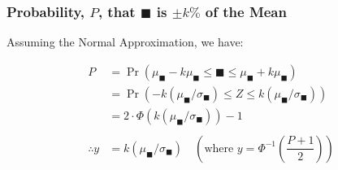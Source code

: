 \documentclass[
]{article}
\begin{document}
\begin{red}

\hypertarget{probability-p-that-blacksquare-is-pm-k-of-the-mean}{%
\subsubsection{\texorpdfstring{Probability, \(P\), that \(\blacksquare\)
is \(\pm k\%\) of the
Mean}{Probability, P, that \textbackslash blacksquare is \textbackslash pm k\textbackslash\% of the Mean}}\label{probability-p-that-blacksquare-is-pm-k-of-the-mean}}

Assuming the Normal Approximation, we have:

\[
  \begin{align}
  P &= \Pr(\mu_{\blacksquare} - k \mu_{\blacksquare} \le \blacksquare \le \mu_{\blacksquare} + k \mu_{\blacksquare}) \\
    &= \Pr(-k(\mu_{\blacksquare}/\sigma_{\blacksquare}) \le Z \le k(\mu_{\blacksquare}/\sigma_{\blacksquare})) \\
    &= 2 \cdot \Phi(k (\mu_\blacksquare/\sigma_\blacksquare)) - 1 \\ \\
  \therefore y &= k(\mu_\blacksquare/\sigma_\blacksquare) \quad \left(\text{where } y = \Phi^{-1}\left(\dfrac{P+1}{2}\right)\right)
  \end{align}
\]

\end{red}
\end{document}
